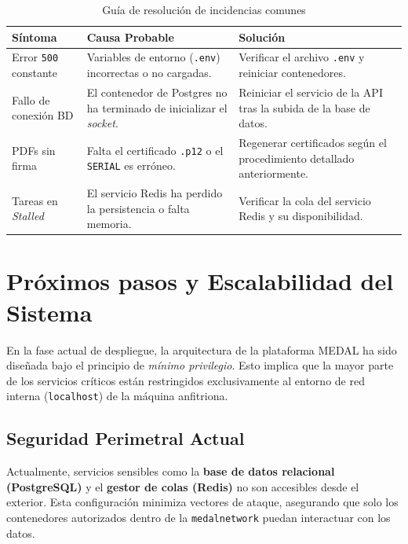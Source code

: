 \documentclass[12pt,a4paper]{report}
\begin{document}
\begin{table}[htbp]
    \centering
    \caption{Guía de resolución de incidencias comunes}
    \label{tab:troubleshooting}
    \small %
    \begin{tabularx}{\textwidth}{@{} >{\hsize=0.6\hsize}X >{\hsize=1.2\hsize}X >{\hsize=1.2\hsize}X @{}}
        \toprule
        \textbf{Síntoma} & \textbf{Causa Probable} & \textbf{Solución} \\
        \midrule
        Error \texttt{500} constante & Variables de entorno (\texttt{.env}) incorrectas o no cargadas. & Verificar el archivo \texttt{.env} y reiniciar contenedores. \\
        \midrule
        Fallo de conexión BD & El contenedor de Postgres no ha terminado de inicializar el \textit{socket}. & Reiniciar el servicio de la API tras la subida de la base de datos. \\
        \midrule
        PDFs sin firma & Falta el certificado \texttt{.p12} o el \texttt{SERIAL} es erróneo. & Regenerar certificados según el procedimiento detallado anteriormente. \\
        \midrule
        Tareas en \textit{Stalled} & El servicio Redis ha perdido la persistencia o falta memoria. & Verificar la cola del servicio Redis y su disponibilidad. \\
        \bottomrule
    \end{tabularx}
\end{table}

\chapter{Próximos pasos y Escalabilidad del Sistema}

En la fase actual de despliegue, la arquitectura de la plataforma MEDAL ha sido diseñada bajo el principio de \textit{mínimo privilegio}. Esto implica que la mayor parte de los servicios críticos están restringidos exclusivamente al entorno de red interna (\texttt{localhost}) de la máquina anfitriona.

\section{Seguridad Perimetral Actual}

Actualmente, servicios sensibles como la \textbf{base de datos relacional (PostgreSQL)} y el \textbf{gestor de colas (Redis)} no son accesibles desde el exterior. Esta configuración minimiza vectores de ataque, asegurando que solo los contenedores autorizados dentro de la \texttt{medalnetwork} puedan interactuar con los datos.
\end{document}
